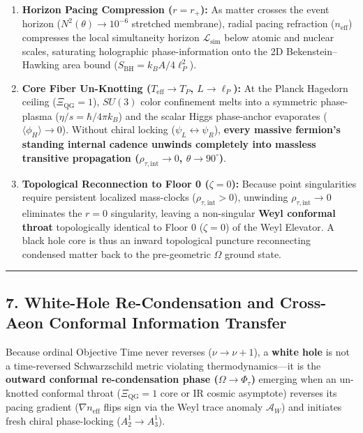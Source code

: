 \documentclass[
]{article}
\providecommand{\tightlist}{%
  \setlength{\itemsep}{0pt}\setlength{\parskip}{0pt}}
\begin{document}
\begin{enumerate}
\def\labelenumi{\arabic{enumi}.}
\tightlist
\item
  \textbf{Horizon Pacing Compression (\(r = r_+\)):} As matter crosses
  the event horizon (\(N^2(\theta) \to 10^{-6}\) stretched membrane),
  radial pacing refraction (\(n_{\text{eff}}\)) compresses the local
  simultaneity horizon \(\mathcal{L}_{\text{sim}}\) below atomic and
  nuclear scales, saturating holographic phase-information onto the 2D
  Bekenstein--Hawking area bound
  (\(S_{\text{BH}} = k_B A / 4\ell_P^2\)).
\item
  \textbf{Core Fiber Un-Knotting (\(T_{\text{eff}} \to T_P\),
  \(L \to \ell_P\)):} At the Planck Hagedorn ceiling
  (\(\Xi_{\text{QG}} = 1\)), \(SU(3)\) color confinement melts into a
  symmetric phase-plasma (\(\eta/s = \hbar / 4\pi k_B\)) and the scalar
  Higgs phase-anchor evaporates (\(\langle \phi_H \rangle \to 0\)).
  Without chiral locking (\(\psi_L \leftrightarrow \psi_R\)),
  \textbf{every massive fermion's standing internal cadence unwinds
  completely into massless transitive propagation
  (\(\rho_{\tau,\text{int}} \to 0\), \(\theta \to 90^\circ\))}.
\item
  \textbf{Topological Reconnection to Floor 0 (\(\zeta = 0\)):} Because
  point singularities require persistent localized mass-clocks
  (\(\rho_{\tau,\text{int}} > 0\)), unwinding
  \(\rho_{\tau,\text{int}} \to 0\) eliminates the \(r = 0\) singularity,
  leaving a non-singular \textbf{Weyl conformal throat} topologically
  identical to Floor 0 (\(\zeta = 0\)) of the Weyl Elevator. A black
  hole core is thus an inward topological puncture reconnecting
  condensed matter back to the pre-geometric \(\Omega\) ground state.
\end{enumerate}

\begin{center}\rule{0.5\linewidth}{0.5pt}\end{center}

\subsection{7. White-Hole Re-Condensation and Cross-Aeon Conformal
Information
Transfer}\label{white-hole-re-condensation-and-cross-aeon-conformal-information-transfer}

Because ordinal Objective Time never reverses (\(\nu \to \nu + 1\)), a
\textbf{white hole} is not a time-reversed Schwarzschild metric
violating thermodynamics---it is the \textbf{outward conformal
re-condensation phase (\(\Omega \to \Phi_\tau\))} emerging when an
un-knotted conformal throat (\(\Xi_{\text{QG}} = 1\) core or IR cosmic
asymptote) reverses its pacing gradient (\(\nabla n_{\text{eff}}\) flips
sign via the Weyl trace anomaly \(\mathcal{A}_W\)) and initiates fresh
chiral phase-locking (\(A_2^1 \to A_3^1\)).
\end{document}

